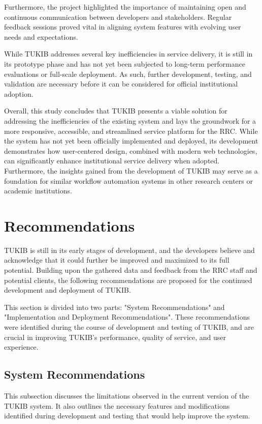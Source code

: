 Furthermore, the project highlighted the importance of maintaining open and continuous communication between developers and stakeholders. Regular feedback sessions proved vital in aligning system features with evolving user needs and expectations.

While TUKIB addresses several key inefficiencies in service delivery, it is still in its prototype phase and has not yet been subjected to long-term performance evaluations or full-scale deployment. As such, further development, testing, and validation are necessary before it can be considered for official institutional adoption.

Overall, this study concludes that TUKIB presents a viable solution for addressing the inefficiencies of the existing system and lays the groundwork for a more responsive, accessible, and streamlined service platform for the RRC. While the system has not yet been officially implemented and deployed, its development demonstrates how user-centered design, combined with modern web technologies, can significantly enhance institutional service delivery when adopted. Furthermore, the insights gained from the development of TUKIB may serve as a foundation for similar workflow automation systems in other research centers or academic institutions.

\section{Recommendations}

TUKIB is still in its early stages of development, and the developers believe and acknowledge that it could further be improved and maximized to its full potential. Building upon the gathered data and feedback from the RRC staff and potential clients, the following recommendations are proposed for the continued development and deployment of TUKIB. 

This section is divided into two parts: "System Recommendations" and "Implementation and Deployment Recommendations". These recommendations were identified during the course of development and testing of TUKIB, and are crucial in improving TUKIB's performance, quality of service, and user experience.

\subsection{System Recommendations}

This subsection discusses the limitations observed in the current version of the TUKIB system. It also outlines the necessary features and modifications identified during development and testing that would help improve the system.


